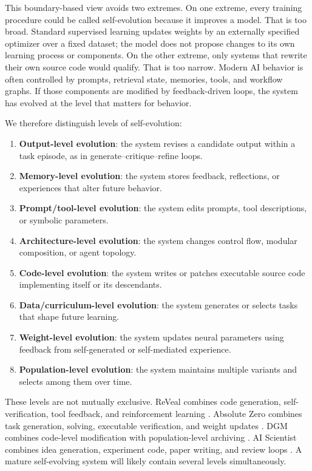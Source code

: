This boundary-based view avoids two extremes. On one extreme, every training procedure could be called self-evolution because it improves a model. That is too broad. Standard supervised learning updates weights by an externally specified optimizer over a fixed dataset; the model does not propose changes to its own learning process or components. On the other extreme, only systems that rewrite their own source code would qualify. That is too narrow. Modern AI behavior is often controlled by prompts, retrieval state, memories, tools, and workflow graphs. If those components are modified by feedback-driven loops, the system has evolved at the level that matters for behavior.

We therefore distinguish levels of self-evolution:

\begin{enumerate}
    \item \textbf{Output-level evolution}: the system revises a candidate output within a task episode, as in generate--critique--refine loops.
    \item \textbf{Memory-level evolution}: the system stores feedback, reflections, or experiences that alter future behavior.
    \item \textbf{Prompt/tool-level evolution}: the system edits prompts, tool descriptions, or symbolic parameters.
    \item \textbf{Architecture-level evolution}: the system changes control flow, modular composition, or agent topology.
    \item \textbf{Code-level evolution}: the system writes or patches executable source code implementing itself or its descendants.
    \item \textbf{Data/curriculum-level evolution}: the system generates or selects tasks that shape future learning.
    \item \textbf{Weight-level evolution}: the system updates neural parameters using feedback from self-generated or self-mediated experience.
    \item \textbf{Population-level evolution}: the system maintains multiple variants and selects among them over time.
\end{enumerate}

These levels are not mutually exclusive. ReVeal combines code generation, self-verification, tool feedback, and reinforcement learning \cite{reveal2025}. Absolute Zero combines task generation, solving, executable verification, and weight updates \cite{absolutezero2025}. DGM combines code-level modification with population-level archiving \cite{darwingodelmachine2025}. AI Scientist combines idea generation, experiment code, paper writing, and review loops \cite{aiscientist2024}. A mature self-evolving system will likely contain several levels simultaneously.

